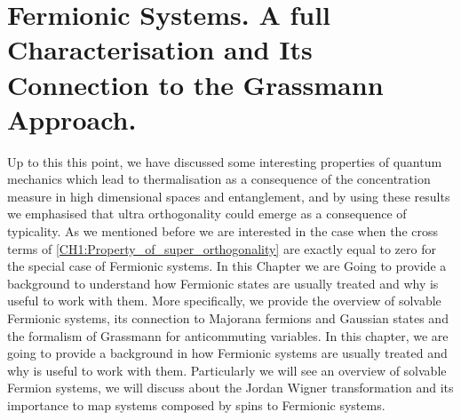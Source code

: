 \chapter{ Fermionic Systems. A full Characterisation and Its Connection to the Grassmann Approach.}
Up to this this point, we have discussed some interesting properties of quantum mechanics which lead to thermalisation as a consequence of the concentration measure in high dimensional spaces and entanglement, and by using these results we emphasised that ultra orthogonality could emerge as a consequence of typicality. As we mentioned before we are interested in the case when the cross terms of \eqref{CH1:Property_of_super_orthogonality} are exactly equal to zero for the special case of Fermionic systems. In this Chapter we are Going to provide a background to understand how Fermionic states are usually treated and why is useful to work with them. More specifically, we provide the overview of solvable Fermionic systems, its connection to Majorana fermions and Gaussian states and the formalism of Grassmann for anticommuting variables. In this chapter, we are going to provide a background in how Fermionic systems are usually treated and why is useful to work with them. Particularly we will see an overview of solvable Fermion systems, we will discuss about the Jordan Wigner transformation and its importance to map systems composed by spins to Fermionic systems.

